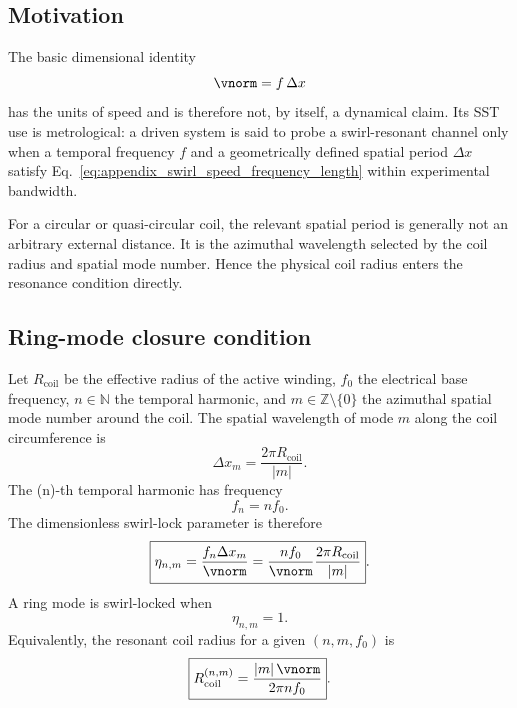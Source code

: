\subsection{Motivation}

The basic dimensional identity
\begin{equation}
\vnorm = f\,\Delta x
\label{eq:appendix_swirl_speed_frequency_length}
\end{equation}
has the units of speed and is therefore not, by itself, a dynamical claim. Its SST use is metrological: a driven system is said to probe a swirl-resonant channel only when a temporal frequency $f$ and a geometrically defined spatial period $\Delta x$ satisfy Eq.~\eqref{eq:appendix_swirl_speed_frequency_length} within experimental bandwidth.

For a circular or quasi-circular coil, the relevant spatial period is generally not an arbitrary external distance. It is the azimuthal wavelength selected by the coil radius and spatial mode number. Hence the physical coil radius enters the resonance condition directly.

\subsection{Ring-mode closure condition}

Let $R_{\mathrm{coil}}$ be the effective radius of the active winding, $f_0$ the electrical base frequency, $n\in\mathbb{N}$ the temporal harmonic, and $m\in\mathbb{Z}\setminus\{0\}$ the azimuthal spatial mode number around the coil. The spatial wavelength of mode $m$ along the coil circumference is
\begin{equation}
\Delta x_m
=
\frac{2\pi R_{\mathrm{coil}}}{|m|}.
\label{eq:appendix_spatial_period}
\end{equation}
The (n)-th temporal harmonic has frequency
\begin{equation}
f_n = n f_0.
\end{equation}
The dimensionless swirl-lock parameter is therefore
\begin{equation}
\boxed{
\eta_{n,m}
=
\frac{f_n \Delta x_m}{\vnorm}
=
\frac{n f_0}{\vnorm}
\frac{2\pi R_{\mathrm{coil}}}{|m|}
}.
\label{eq:appendix_eta_nm}
\end{equation}
A ring mode is swirl-locked when
\begin{equation}
\boxed{\eta_{n,m}=1.}
\label{eq:appendix_eta_lock}
\end{equation}
Equivalently, the resonant coil radius for a given $(n,m,f_0)$ is
\begin{equation}
\boxed{
R_{\mathrm{coil}}^{(n,m)}
=
\frac{|m|\,\vnorm}{2\pi n f_0}
}.
\label{eq:appendix_resonant_radius}
\end{equation}

